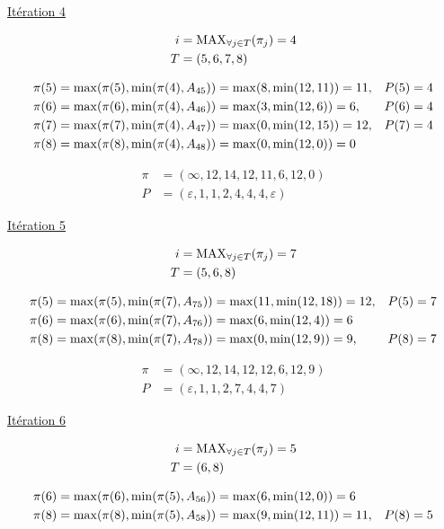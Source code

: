 \documentclass{article}
\begin{document}
\underline{Itération 4}

\begin{align*}
  i &= \operatorname{MAX}_{\forall j \in T}(\pi_j) = 4\\
  T &= (5,6,7,8)
\end{align*}

\begin{align*}
  &\pi(5) = \operatorname{max}(\pi(5), \operatorname{min}(\pi(4), A_{45})) = \operatorname{max}(8, \operatorname{min}(12,11)) = 11, &P(5) = 4\\
  &\pi(6) = \operatorname{max}(\pi(6), \operatorname{min}(\pi(4), A_{46})) = \operatorname{max}(3, \operatorname{min}(12,6)) = 6, &P(6) = 4\\
  &\pi(7) = \operatorname{max}(\pi(7), \operatorname{min}(\pi(4), A_{47})) = \operatorname{max}(0, \operatorname{min}(12,15)) = 12, &P(7) = 4\\
  &\pi(8) = \operatorname{max}(\pi(8), \operatorname{min}(\pi(4), A_{48})) = \operatorname{max}(0, \operatorname{min}(12,0)) = 0
\end{align*}

\begin{align*}
  \pi &= (\infty,12,14,12,11,6,12,0)\\
  P &= (\varepsilon, 1, 1, 2, 4, 4, 4, \varepsilon)
\end{align*}

\underline{Itération 5}

\begin{align*}
  i &= \operatorname{MAX}_{\forall j \in T}(\pi_j) = 7\\
  T &= (5,6,8)
\end{align*}

\begin{align*}
  &\pi(5) = \operatorname{max}(\pi(5), \operatorname{min}(\pi(7), A_{75})) = \operatorname{max}(11, \operatorname{min}(12,18)) = 12, &P(5) = 7\\
  &\pi(6) = \operatorname{max}(\pi(6), \operatorname{min}(\pi(7), A_{76})) = \operatorname{max}(6, \operatorname{min}(12,4)) = 6\\
  &\pi(8) = \operatorname{max}(\pi(8), \operatorname{min}(\pi(7), A_{78})) = \operatorname{max}(0, \operatorname{min}(12,9)) = 9, &P(8) = 7
\end{align*}

\begin{align*}
  \pi &= (\infty,12,14,12,12,6,12,9)\\
  P &= (\varepsilon, 1, 1, 2, 7, 4, 4, 7)
\end{align*}

\underline{Itération 6}

\begin{align*}
  i &= \operatorname{MAX}_{\forall j \in T}(\pi_j) = 5\\
  T &= (6,8)
\end{align*}

\begin{align*}
  &\pi(6) = \operatorname{max}(\pi(6), \operatorname{min}(\pi(5), A_{56})) = \operatorname{max}(6, \operatorname{min}(12,0)) = 6\\
  &\pi(8) = \operatorname{max}(\pi(8), \operatorname{min}(\pi(5), A_{58})) = \operatorname{max}(9, \operatorname{min}(12,11)) = 11, &P(8) = 5
\end{align*}
\end{document}
